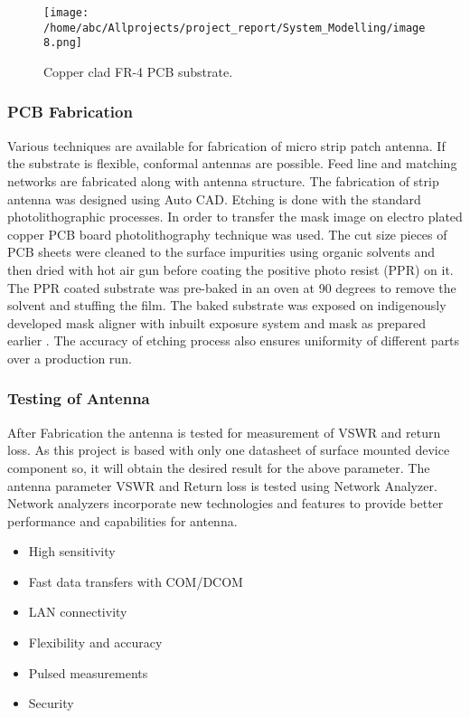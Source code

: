 \documentclass[12pt]{article}
\begin{document}
		            \begin{figure}[H]
		            	\centering
		            	\texttt{[image: /home/abc/Allprojects/project\_report/System\_Modelling/image8.png]}
		            	\caption{Copper clad FR-4 PCB substrate.}
		            \end{figure}


\subsubsection{PCB Fabrication}
\justify
Various techniques are available for fabrication of micro strip patch antenna. If the substrate is flexible, conformal antennas are possible. Feed line and matching networks are fabricated along with antenna structure. The fabrication of strip antenna was designed using Auto CAD. Etching is done with the standard photolithographic processes. In order to transfer the mask image on electro plated copper PCB board photolithography technique was used. The cut size pieces of PCB sheets were cleaned to the surface impurities using organic solvents and then dried with hot air gun before coating the positive photo resist (PPR) on it. The PPR coated substrate was pre-baked in an oven at 90 degrees to remove the solvent and stuffing the film. The baked substrate was exposed on indigenously developed mask aligner with inbuilt exposure system and mask as prepared earlier . The accuracy of etching process also ensures uniformity of different parts over a production run.

\cleardoublepage
\subsubsection{ Testing of Antenna}
\justify
After Fabrication the antenna is tested for measurement of VSWR and return loss. As this project is based with only one datasheet of surface mounted device component so, it will obtain the desired result for the above parameter. The antenna parameter VSWR and Return loss is tested using Network Analyzer. Network analyzers incorporate new technologies and features to provide better performance and capabilities for antenna.

\begin{itemize}
	\item High sensitivity
	\item Fast data transfers with COM/DCOM
	\item LAN connectivity
	\item Flexibility and accuracy
	\item Pulsed measurements
	\item Security
\end{itemize}
\cleardoublepage
\end{document}
